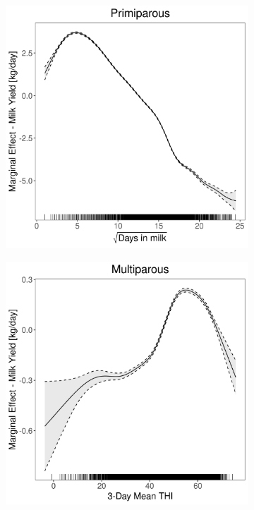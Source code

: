 \begin{figure}[H]
\begin{subfigure}[b]{0.45\textwidth}
    \end{subfigure}
    \hspace{0.05\textwidth} %
    \begin{subfigure}[b]{0.45\textwidth}
        \centering
        \includegraphics[width=\textwidth]{thesis/figures/models/milk/before2010/ob_milk_before2010/ob_milk_before2010_marginal_dim_milk_primi.png}
    \end{subfigure}
    \begin{subfigure}[b]{0.45\textwidth}
        \centering
        \includegraphics[width=\textwidth]{thesis/figures/models/milk/before2010/ob_milk_before2010/ob_milk_before2010_marginal_thi_milk_multi.png}

\end{subfigure}
\end{figure}
